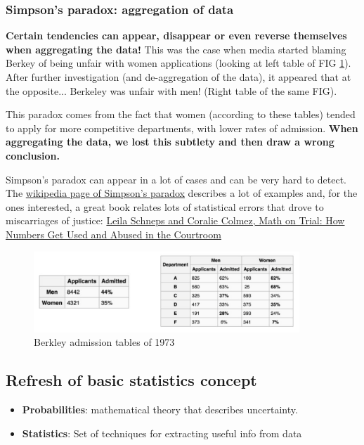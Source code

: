 \subsubsection{Simpson's paradox: aggregation of data}

\textbf{Certain tendencies can appear, disappear or even reverse themselves when aggregating the data!} This was the case when media started blaming Berkey of being unfair with women applications (looking at left table of FIG \ref{pic:Berkley}). After further investigation (and de-aggregation of the data), it appeared that at the opposite... Berkeley was unfair with men! (Right table of the same FIG).

This paradox comes from the fact that women (according to these tables) tended to apply for more competitive departments, with lower rates of admission. \textbf{When aggregating the data, we lost this subtlety and then draw a wrong conclusion.} 

Simpson's paradox can appear in a lot of cases and can be very hard to detect. The \href{https://en.wikipedia.org/wiki/Simpsons_paradox}{wikipedia page of Simpson's paradox} describes a lot of examples and, for the ones interested, a great book relates lots of statistical errors that drove to miscarriages of justice: \href{https://books.google.ch/books/about/Math_on_Trial.html?id=PFAIb6FTgY4C&source=kp_cover&redir_esc=y&hl=fr}{Leila Schneps and Coralie Colmez, Math on Trial: How Numbers Get Used and Abused in the Courtroom} 

\begin{figure}[h]%
 \centering
 \includegraphics[width=10cm]{./img/05/Berkeley}
 \caption{\label{pic:Berkley}Berkley admission tables of 1973}
\end{figure}

\subsection{Refresh of basic statistics concept}

\begin{itemize}
	\item {\bf Probabilities}: mathematical theory that describes uncertainty. \\
	\item {\bf Statistics}: Set of techniques for extracting useful info from data
\end{itemize}

